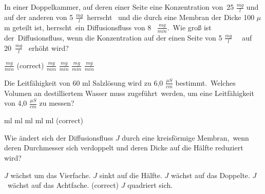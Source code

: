 \documentclass[11pt]{exam}
\begin{document}
\setlength{\voffset}{-0.5in}
\setlength{\headsep}{5pt}

\hspace{2mm}
 \hspace{5mm}
\vspace{4mm}

\begin{questions}

\question In einer Doppelkammer, auf deren einer Seite eine Konzentration von 25 \(\frac{mg}{l} \) und auf der anderen von 5 \(  \frac{mg}{l} \) herrscht  und die durch eine Membran der Dicke 100 \(\mu \)m geteilt ist, herrscht ein Diffusionsfluss von 8  \( \frac{mg}{min}\). Wie groß ist der Diffusionsfluss, wenn die Konzentration auf der einen Seite von 5 \(  \frac{mg}{l} \)   auf 20 \(  \frac{mg}{l} \)  erhöht wird?

\begin{choices}
	 \( \frac{mg}{min} \) (correct)
	 \( \frac{mg}{min} \)
	 \( \frac{mg}{min} \)
	 \( \frac{mg}{min} \)
	 \( \frac{mg}{min} \)
\end{choices}

\vspace{3mm}\question Die Leitfähigkeit von 60 ml Salzlösung wird zu 6,0 \( \frac{\mu S}{cm} \) bestimmt. Welches Volumen an destilliertem Wasser muss zugeführt werden, um eine Leitfähigkeit von 4,0 \( \frac{\mu S}{cm} \) zu messen?

\begin{choices}
	 ml
	 ml
	 ml
	 ml
	 ml (correct)
\end{choices}

\vspace{3mm}\question Wie ändert sich der Diffusionsfluss \( J \) durch eine kreisförmige Membran, wenn deren Durchmesser sich verdoppelt und deren Dicke auf die Hälfte reduziert wird?

\begin{choices}
	\choice \( J \) wächst um das Vierfache.
	\choice \( J \) sinkt auf die Hälfte.
	\choice \( J \) wächst auf das Doppelte.
	\choice \( J \) wächst auf das Achtfache. (correct)
	\choice \( J \) quadriert sich.
\end{choices}


\end{questions}
\end{document}
